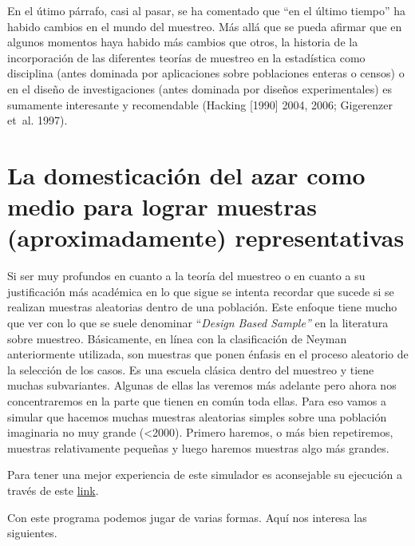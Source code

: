 \documentclass[
  spanish,
  a4paper,
]{scrreprt}
\begin{document}
En el útimo párrafo, casi al pasar, se ha comentado que ``en el último
tiempo'' ha habido cambios en el mundo del muestreo. Más allá que se
pueda afirmar que en algunos momentos haya habido más cambios que otros,
la historia de la incorporación de las diferentes teorías de muestreo en
la estadística como disciplina (antes dominada por aplicaciones sobre
poblaciones enteras o censos) o en el diseño de investigaciones (antes
dominada por diseños experimentales) es sumamente interesante y
recomendable (Hacking {[}1990{]} 2004, 2006; Gigerenzer et~al. 1997).


\chapter{La domesticación del azar como medio para lograr muestras
(aproximadamente)
representativas}\label{la-domesticaciuxf3n-del-azar-como-medio-para-lograr-muestras-aproximadamente-representativas}

Si ser muy profundos en cuanto a la teoría del muestreo o en cuanto a su
justificación más académica en lo que sigue se intenta recordar que
sucede si se realizan muestras aleatorias dentro de una población. Este
enfoque tiene mucho que ver con lo que se suele denominar ``\emph{Design
Based Sample''} en la literatura sobre muestreo\emph{.} Básicamente, en
línea con la clasificación de Neyman anteriormente utilizada, son
muestras que ponen énfasis en el proceso aleatorio de la selección de
los casos. Es una escuela clásica dentro del muestreo y tiene muchas
subvariantes. Algunas de ellas las veremos más adelante pero ahora nos
concentraremos en la parte que tienen en común toda ellas. Para eso
vamos a simular que hacemos muchas muestras aleatorias simples sobre una
población imaginaria no muy grande (\textless2000). Primero haremos, o
más bien repetiremos, muestras relativamente pequeñas y luego haremos
muestras algo más grandes.

Para tener una mejor experiencia de este simulador es aconsejable su
ejecución a través de este
\href{https://planificacion-muestreo.netlify.app/simulador_teorema_limite_central.html}{link}.

Con este programa podemos jugar de varias formas. Aquí nos interesa las
siguientes.
\end{document}
